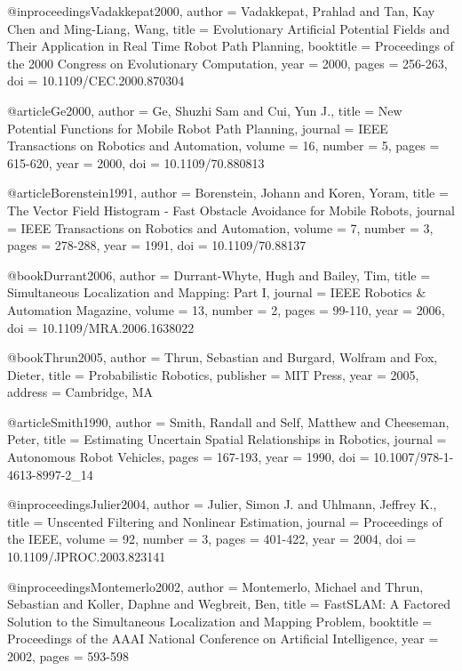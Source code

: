 @inproceedings{Vadakkepat2000,
  author = {Vadakkepat, Prahlad and Tan, Kay Chen and Ming-Liang, Wang},
  title = {Evolutionary Artificial Potential Fields and Their Application in Real Time Robot Path Planning},
  booktitle = {Proceedings of the 2000 Congress on Evolutionary Computation},
  year = {2000},
  pages = {256-263},
  doi = {10.1109/CEC.2000.870304}
}

@article{Ge2000,
  author = {Ge, Shuzhi Sam and Cui, Yun J.},
  title = {New Potential Functions for Mobile Robot Path Planning},
  journal = {IEEE Transactions on Robotics and Automation},
  volume = {16},
  number = {5},
  pages = {615-620},
  year = {2000},
  doi = {10.1109/70.880813}
}

@article{Borenstein1991,
  author = {Borenstein, Johann and Koren, Yoram},
  title = {The Vector Field Histogram - Fast Obstacle Avoidance for Mobile Robots},
  journal = {IEEE Transactions on Robotics and Automation},
  volume = {7},
  number = {3},
  pages = {278-288},
  year = {1991},
  doi = {10.1109/70.88137}
}

@book{Durrant2006,
  author = {Durrant-Whyte, Hugh and Bailey, Tim},
  title = {Simultaneous Localization and Mapping: Part I},
  journal = {IEEE Robotics \& Automation Magazine},
  volume = {13},
  number = {2},
  pages = {99-110},
  year = {2006},
  doi = {10.1109/MRA.2006.1638022}
}

@book{Thrun2005,
  author = {Thrun, Sebastian and Burgard, Wolfram and Fox, Dieter},
  title = {Probabilistic Robotics},
  publisher = {MIT Press},
  year = {2005},
  address = {Cambridge, MA}
}

@article{Smith1990,
  author = {Smith, Randall and Self, Matthew and Cheeseman, Peter},
  title = {Estimating Uncertain Spatial Relationships in Robotics},
  journal = {Autonomous Robot Vehicles},
  pages = {167-193},
  year = {1990},
  doi = {10.1007/978-1-4613-8997-2_14}
}

@inproceedings{Julier2004,
  author = {Julier, Simon J. and Uhlmann, Jeffrey K.},
  title = {Unscented Filtering and Nonlinear Estimation},
  journal = {Proceedings of the IEEE},
  volume = {92},
  number = {3},
  pages = {401-422},
  year = {2004},
  doi = {10.1109/JPROC.2003.823141}
}

@inproceedings{Montemerlo2002,
  author = {Montemerlo, Michael and Thrun, Sebastian and Koller, Daphne and Wegbreit, Ben},
  title = {FastSLAM: A Factored Solution to the Simultaneous Localization and Mapping Problem},
  booktitle = {Proceedings of the AAAI National Conference on Artificial Intelligence},
  year = {2002},
  pages = {593-598}
}

